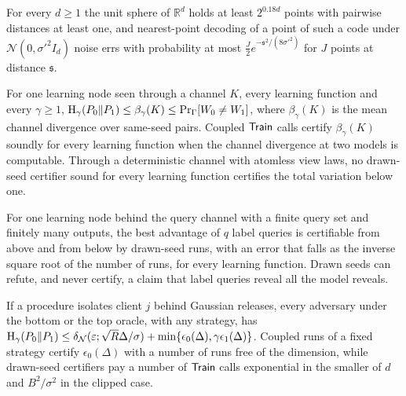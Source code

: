 \begin{lemma}
For every $d\ge1$ the unit sphere of $\mathbb R^d$ holds at least $2^{0.18d}$ points
with pairwise distances at least one, and nearest-point decoding of a point of
such a code under $\mathcal N(0,\sigma'^2I_d)$ noise errs with probability at most
$\frac J2e^{-\mathfrak s^2/(8\sigma'^2)}$ for $J$ points at distance $\mathfrak s$.
\end{lemma}

\begin{theorem}
For one learning node seen through a channel $K$, every learning function and
every $\gamma\ge1$, $\mathrm{H}_\gamma(P_0\|P_1)\le\beta_\gamma(K)\le\Pr_\Gamma[W_0\ne W_1]$, where
$\beta_\gamma(K)$ is the mean channel divergence over same-seed pairs. Coupled $\mathsf{Train}$
calls certify $\beta_\gamma(K)$ soundly for every learning function when the channel
divergence at two models is computable. Through a deterministic channel with
atomless view laws, no drawn-seed certifier sound for every learning function
certifies the total variation below one.
\end{theorem}

\begin{theorem}
For one learning node behind the query channel with a finite query set and
finitely many outputs, the best advantage of $q$ label queries is certifiable from
above and from below by drawn-seed runs, with an error that falls as the inverse
square root of the number of runs, for every learning function. Drawn seeds can
refute, and never certify, a claim that label queries reveal all the model reveals.
\end{theorem}

\begin{theorem}
If a procedure isolates client $j$ behind Gaussian releases, every adversary under
the bottom or the top oracle, with any strategy, has
$\mathrm{H}_\gamma(P_0\|P_1)\le\delta_{\mathcal N}(\varepsilon;\sqrt R\Delta/\sigma)+\min\{\epsilon_0(\Delta),\gamma\epsilon_1(\Delta)\}$.
Coupled runs of a fixed strategy certify $\epsilon_0(\Delta)$ with a number of runs
free of the dimension, while drawn-seed certifiers pay a number of $\mathsf{Train}$ calls
exponential in the smaller of $d$ and $B^2/\sigma^2$ in the clipped case.
\end{theorem}

